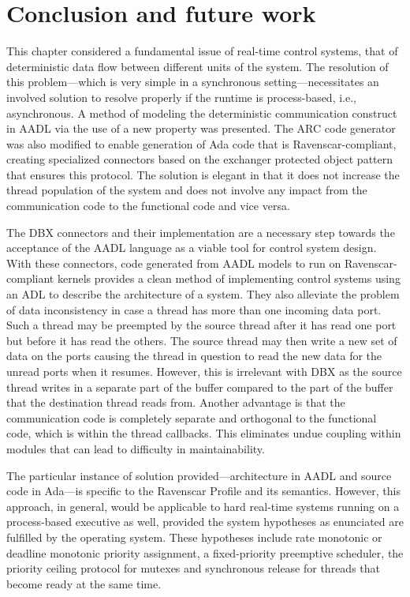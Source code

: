 \newpage
\section{Conclusion and future work}
This chapter considered a fundamental issue of real-time control
systems, that of deterministic data flow between different units of
the system. The resolution of this problem---which is very simple in a
synchronous setting---necessitates an involved solution to resolve
properly if the runtime is process-based, i.e., asynchronous. A method
of modeling the deterministic communication construct in AADL via the
use of a new property was presented. The ARC code generator was also
modified to enable generation of Ada code that is Ravenscar-compliant,
creating specialized connectors based on the exchanger protected
object pattern that ensures this protocol. The solution is elegant in
that it does not increase the thread population of the system and does
not involve any impact from the communication code to the functional
code and vice versa.

The DBX connectors and their implementation are a necessary step
towards the acceptance of the AADL language as a viable tool for
control system design. With these connectors, code generated from AADL
models to run on Ravenscar-compliant kernels provides a clean method
of implementing control systems using an ADL to describe the
architecture of a system. They also alleviate the problem of data
inconsistency in case a thread has more than one incoming data
port. Such a thread may be preempted by the source thread after it has
read one port but before it has read the others. The source thread may
then write a new set of data on the ports causing the thread in
question to read the new data for the unread ports when it
resumes. However, this is irrelevant with DBX as the source thread
writes in a separate part of the buffer compared to the part of the
buffer that the destination thread reads from. Another advantage is
that the communication code is completely separate and orthogonal to
the functional code, which is within the thread callbacks. This
eliminates undue coupling within modules that can lead to difficulty
in maintainability.

The particular instance of solution provided---architecture in AADL
and source code in Ada---is specific to the Ravenscar Profile and its
semantics. However, this approach, in general, would be applicable to
hard real-time systems running on a process-based executive as well,
provided the system hypotheses as enunciated are fulfilled by the
operating system. These hypotheses include rate monotonic or deadline
monotonic priority assignment, a fixed-priority preemptive scheduler,
the priority ceiling protocol for mutexes and synchronous release for
threads that become ready at the same time.

